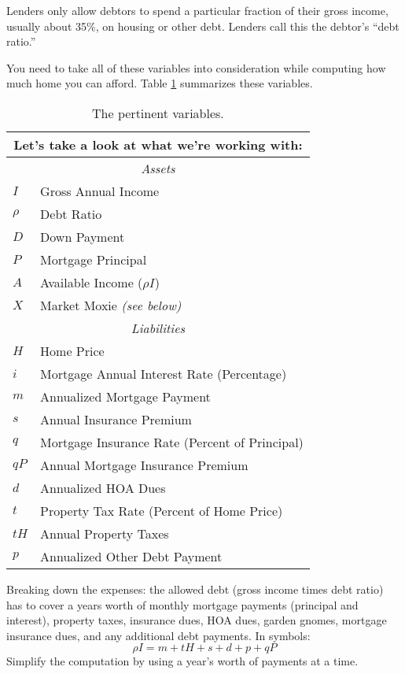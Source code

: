 \documentclass{article}
\begin{document}
Lenders only allow debtors to spend a particular fraction of their
 gross income, usually about 35\%, on housing or other debt.
Lenders call this the debtor's ``debt ratio.'' 

You need to take all of these variables into consideration while 
computing how much  home you can afford. 
Table \ref{table:variables} summarizes these variables.

\begin{table}
\begin{center}
\begin{tabular}{ll}
\multicolumn{2}{c}{Let's take a look at what we're working with:} \\
\hline
\hline
\multicolumn{2}{c}{\emph{Assets}} \\
$I$ & Gross Annual Income \\
$\rho$ & Debt Ratio \\
$D$ & Down Payment \\
$P$ & Mortgage Principal \\
$A$ & Available Income ($\rho I$) \\
$X$ & Market Moxie \emph{(see below)} \\
\hline
\multicolumn{2}{c}{\emph{Liabilities}} \\
$H$ & Home Price \\
$i$ & Mortgage Annual Interest Rate (Percentage)\\
$m$ & Annualized Mortgage Payment \\
$s$ & Annual Insurance Premium \\
$q$ & Mortgage Insurance Rate (Percent of Principal)\\
$qP$ & Annual Mortgage Insurance Premium \\
$d$ & Annualized HOA Dues \\
$t$ & Property Tax Rate (Percent of Home Price) \\
$tH$ & Annual Property Taxes \\
$p$ & Annualized Other Debt Payment \\
\hline
\hline
\end{tabular}
\caption{The pertinent variables.}
\label{table:variables}
\end{center}
\end{table}

Breaking down the expenses: the allowed
debt (gross income times debt ratio) has to cover 
a years worth of monthly mortgage payments (principal and interest),
 property taxes, insurance dues, HOA dues, garden gnomes,
mortgage insurance dues, and  
any additional debt payments. In symbols:
\begin{equation}
\label{DebtRatio}
\rho I = m + tH + s + d + p + qP
\end{equation}
Simplify the computation by using a year's worth of 
payments at a time.
\end{document}
